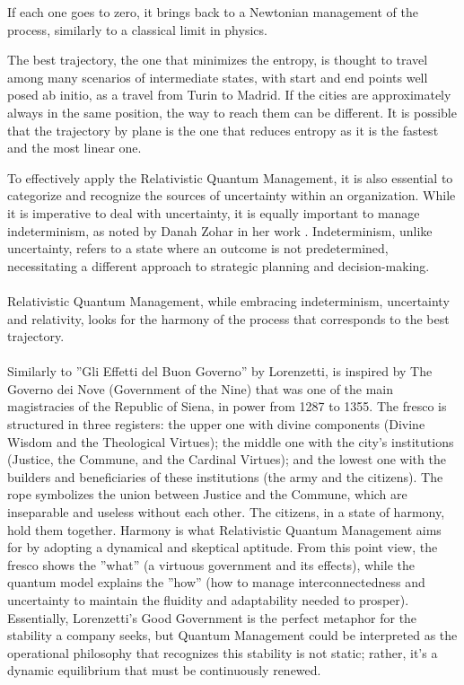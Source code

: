 \documentclass{article}
\begin{document}
If each one goes to zero, it brings back to a Newtonian management of the process, similarly to a classical limit in physics.

The best trajectory, the one that minimizes the entropy, is thought to travel among many scenarios of intermediate states, with start and end points well posed ab initio, as a travel from Turin to Madrid. If the cities are approximately always in the same position, the way to reach them can be different. It is possible that the trajectory by plane is the one that reduces entropy as it is the fastest and the most linear one.

To effectively apply the Relativistic Quantum Management, it is also essential to categorize and recognize the sources of uncertainty within an organization. While it is imperative to deal with uncertainty, it is equally important to manage indeterminism, as noted by Danah Zohar in her work \cite{zohar2021zerodistance}. Indeterminism, unlike uncertainty, refers to a state where an outcome is not predetermined, necessitating a different approach to strategic planning and decision-making.\\\\
Relativistic Quantum Management, while embracing indeterminism, uncertainty and relativity, looks for the harmony of the process that corresponds to the best trajectory.\\\\Similarly to ”Gli Effetti del Buon Governo” by Lorenzetti, is inspired by The Governo dei Nove (Government of the Nine)
that was one of the main magistracies of the Republic of Siena, in power from 1287 to 1355. The fresco is structured in three
registers: the upper one with divine components (Divine Wisdom and the Theological Virtues); the middle one with the
city’s institutions (Justice, the Commune, and the Cardinal Virtues); and the lowest one with the builders and beneficiaries
of these institutions (the army and the citizens). The rope symbolizes the union between Justice and the Commune, which
are inseparable and useless without each other. The citizens, in a state of harmony, hold them together.
Harmony is what Relativistic Quantum Management aims for by adopting a dynamical and skeptical aptitude. From
this point view, the fresco shows the ”what” (a virtuous government and its effects), while the quantum model explains the
”how” (how to manage interconnectedness and uncertainty to maintain the fluidity and adaptability needed to prosper).
Essentially, Lorenzetti’s Good Government is the perfect metaphor for the stability a company seeks, but Quantum
Management could be interpreted as the operational philosophy that recognizes this stability is not static; rather, it’s a
dynamic equilibrium that must be continuously renewed.
\end{document}

